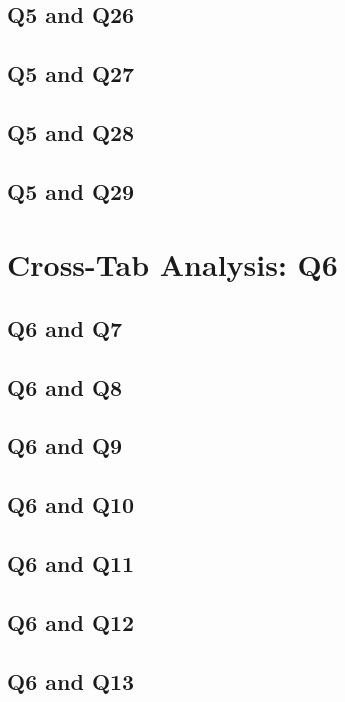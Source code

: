 \documentclass{report}
\begin{document}
\section{Q5 and Q26}\clearpage
\section{Q5 and Q27}\clearpage
\section{Q5 and Q28}\clearpage
\section{Q5 and Q29}\clearpage

\chapter{Cross-Tab Analysis: Q6}

\section{Q6 and Q7}\clearpage
\section{Q6 and Q8}\clearpage
\section{Q6 and Q9}\clearpage
\section{Q6 and Q10}\clearpage
\section{Q6 and Q11}\clearpage
\section{Q6 and Q12}\clearpage
\section{Q6 and Q13}\clearpage
\end{document}
